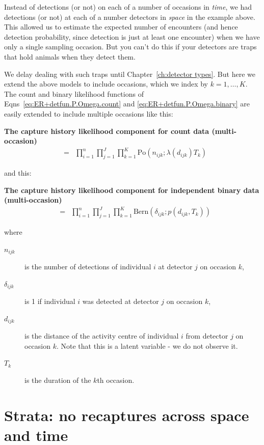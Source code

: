 \documentclass[graybox,envcountchap,sectrefs]{SpringerStyleFiles/styles/svmono}\usepackage[]{graphicx}\usepackage[]{color}
\newcommand{\be}{\begin{eqnarray}}
\newcommand{\ee}{\end{eqnarray}}
\newcommand{\bd}{\begin{description}}
\newcommand{\ed}{\end{description}}
\begin{document}
Instead of detections (or not) on each of a number of occasions in \textit{time}, we had detections (or not) at each of a number detectors in \textit{space} in the example above. This allowed us to estimate the expected number of encounters (and hence detection probability, since detection is just at least one encounter) when we have only a single sampling occasion. But you can't do this if your detectors are traps that hold animals when they detect them. 

We delay dealing with such traps until Chapter~\ref{ch:detector types}. But here we extend the above models to include occasions, which we index by $k=1,\ldots,K$. The count and binary likelihood functions of Eqns~\eqref{eq:ER+detfun.P.Omega.count} and \eqref{eq:ER+detfun.P.Omega.binary} are easily extended to include multiple occasions like this:
\begin{svgraybox}
\bf{The capture history likelihood component for count data (multi-occasion)}
\be
[\bm{\Omega}_n|\bm{S}_n]&=&\prod_{i=1}^n\prod_{j=1}^J\prod_{k=1}^K\mbox{Po}\left(n_{ijk};\lambda(d_{ijk})T_k\right)
\label{eq:ER+detfun.P.Omega.count.occ}
\ee
\end{svgraybox}
and this:
\begin{svgraybox}
\bf{The capture history likelihood component for independent binary data (multi-occasion)}
\be
[\bm{\Omega}_n|\bm{S}_n]&=&\prod_{i=1}^n\prod_{j=1}^J\prod_{k=1}^K\mbox{Bern}\left(\delta_{ijk};p(d_{ijk},T_k)\right)
\label{eq:ER+detfun.P.Omega.binary.occ}
\ee
\end{svgraybox}
\noindent
where
\begin{svgraybox}
\bd
\item[$n_{ijk}$] is the number of detections of individual $i$ at detector $j$ on occasion $k$,
\item[$\delta_{ijk}$] is 1 if individual $i$ was detected at detector $j$ on occasion $k$,
\item[$d_{ijk}$] is the distance of the activity centre of individual $i$ from detector $j$ on occasion $k$. Note that this is a latent variable - we do not observe it.
\item[$T_k$] is the duration of the $k$th occasion.
\ed
\end{svgraybox}

\section{Strata: no recaptures across space and time}
\label{sec:ER+detfun.strata}
\end{document}
